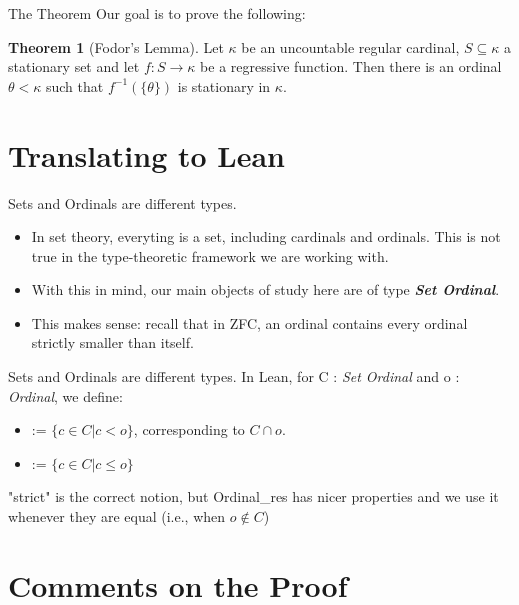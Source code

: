\documentclass{beamer}
\theoremstyle{definition}
\newtheorem{thm}[subsection]{Theorem}
\begin{document}
\begin{frame}{The Theorem}
    Our goal is to prove the following:
    \begin{thm}[Fodor's Lemma]
       Let $\kappa$ be an uncountable regular cardinal, $S\subseteq\kappa$ a stationary set and let $f:S\rightarrow \kappa$ be a regressive function. Then there is an ordinal $\theta <\kappa$ such that $f^{-1}(\{\theta\})$ is stationary in $\kappa$.
    \end{thm}
\end{frame}

\section{Translating to Lean}

\begin{frame}{Sets and Ordinals are different types.}
    \begin{itemize}
        \item In set theory, everyting is a set, including cardinals and ordinals. This is not true in the type-theoretic framework we are working with. \pause
        \item With this in mind, our main objects of study here are of type \textit{\textbf{Set Ordinal}}. \pause
        \item This makes sense: recall that in ZFC, an ordinal contains every ordinal strictly smaller than itself.
    \end{itemize}
\end{frame}

\begin{frame}{Sets and Ordinals are different types.}
    In Lean, for C : \textit{Set Ordinal} and o : \textit{Ordinal}, we define:
    \begin{itemize}
        \item {} := $\{c\in C | c < o\}$, corresponding to $C\cap o.$ \pause
        \item {} := $\{c\in C | c \leq o\}$ \pause
    \end{itemize}
    "strict" is the correct notion, but Ordinal\_res has nicer properties and we use it whenever they are equal (i.e., when $o\notin C$)
\end{frame}

\section{Comments on the Proof}
\end{document}
